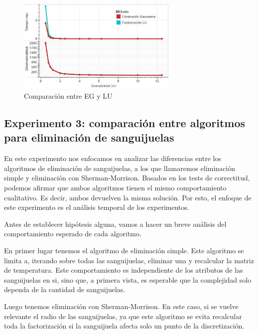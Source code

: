 \begin{figure}[b]
    \centering
    \includegraphics[width=0.685\textwidth]{experimento 2-1}
    \caption{Comparación entre EG y LU}
    \label{fig:exp21}
\end{figure}



\pagebreak

\subsection{Experimento 3: comparación entre algoritmos para eliminación de sanguijuelas}

En este experimento nos enfocamos en analizar las diferencias entre los algoritmos de eliminación de sanguijuelas, a los que llamaremos eliminación simple y eliminación con Sherman-Morrison. Basados en los tests de correctitud, podemos afirmar que ambos algoritmos tienen el mismo comportamiento cualitativo. Es decir, ambos devuelven la misma solución. Por esto, el enfoque de este experimento es el análisis temporal de los experimentos. 

Antes de establecer hipótesis alguna, vamos a hacer un breve análisis del comportamiento esperado de cada algoritmo.

En primer lugar tenemos el algoritmo de eliminación simple. Este algoritmo se limita a, iterando sobre todas las sanguijuelas, eliminar una y recalcular la matriz de temperatura. Este comportamiento es independiente de los atributos de las sanguijuelas en si, sino que, a primera vista, es esperable que la complejidad solo dependa de la cantidad de sanguijuelas.

Luego tenemos eliminación con Sherman-Morrison. En este caso, si se vuelve relevante el radio de las sanguijuelas, ya que este algoritmo se evita recalcular toda la factorizaci\'on si la sanguijuela afecta solo un punto de la discretizaci\'on. 


